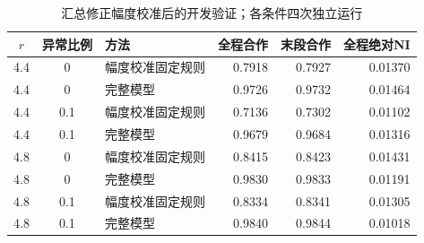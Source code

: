 \begin{table}[!htbp]
\centering\small
\caption{汇总修正幅度校准后的开发验证；各条件四次独立运行}
\label{tab:w2-amplitude}
\begin{tabular}{cclrrr}
\toprule
$r$ & 异常比例 & 方法 & 全程合作 & 末段合作 & 全程绝对NI \\
\midrule
4.4 & 0 & 幅度校准固定规则 & 0.7918 & 0.7927 & 0.01370 \\
4.4 & 0 & 完整模型 & 0.9726 & 0.9732 & 0.01464 \\
4.4 & 0.1 & 幅度校准固定规则 & 0.7136 & 0.7302 & 0.01102 \\
4.4 & 0.1 & 完整模型 & 0.9679 & 0.9684 & 0.01316 \\
4.8 & 0 & 幅度校准固定规则 & 0.8415 & 0.8423 & 0.01431 \\
4.8 & 0 & 完整模型 & 0.9830 & 0.9833 & 0.01191 \\
4.8 & 0.1 & 幅度校准固定规则 & 0.8334 & 0.8341 & 0.01305 \\
4.8 & 0.1 & 完整模型 & 0.9840 & 0.9844 & 0.01018 \\
\bottomrule
\end{tabular}
\par{}
\end{table}

